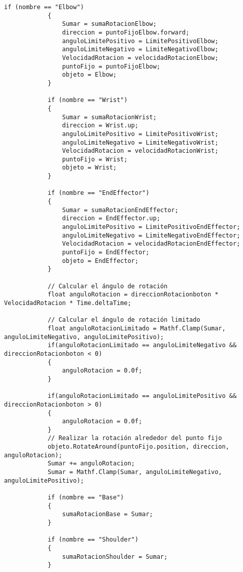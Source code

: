 \begin{lstlisting}[frame=single]
            if (nombre == "Elbow")
            {
                Sumar = sumaRotacionElbow;
                direccion = puntoFijoElbow.forward;
                anguloLimitePositivo = LimitePositivoElbow;
                anguloLimiteNegativo = LimiteNegativoElbow;
                VelocidadRotacion = velocidadRotacionElbow;
                puntoFijo = puntoFijoElbow;
                objeto = Elbow;
            }
    
            if (nombre == "Wrist")
            {
                Sumar = sumaRotacionWrist;
                direccion = Wrist.up;
                anguloLimitePositivo = LimitePositivoWrist;
                anguloLimiteNegativo = LimiteNegativoWrist;
                VelocidadRotacion = velocidadRotacionWrist;
                puntoFijo = Wrist;
                objeto = Wrist;
            }
    
            if (nombre == "EndEffector")
            {
                Sumar = sumaRotacionEndEffector;
                direccion = EndEffector.up;
                anguloLimitePositivo = LimitePositivoEndEffector;
                anguloLimiteNegativo = LimiteNegativoEndEffector;
                VelocidadRotacion = velocidadRotacionEndEffector;
                puntoFijo = EndEffector;
                objeto = EndEffector;
            }
            
            // Calcular el ángulo de rotación
            float anguloRotacion = direccionRotacionboton * VelocidadRotacion * Time.deltaTime;
            
            // Calcular el ángulo de rotación limitado
            float anguloRotacionLimitado = Mathf.Clamp(Sumar, anguloLimiteNegativo, anguloLimitePositivo);
            if(anguloRotacionLimitado == anguloLimiteNegativo && direccionRotacionboton < 0)
            {
                anguloRotacion = 0.0f;
            }
    
            if(anguloRotacionLimitado == anguloLimitePositivo && direccionRotacionboton > 0)
            {
                anguloRotacion = 0.0f;
            }
            // Realizar la rotación alrededor del punto fijo
            objeto.RotateAround(puntoFijo.position, direccion, anguloRotacion);
            Sumar += anguloRotacion;
            Sumar = Mathf.Clamp(Sumar, anguloLimiteNegativo, anguloLimitePositivo);
    
            if (nombre == "Base")
            {
                sumaRotacionBase = Sumar;
            }
    
            if (nombre == "Shoulder")
            {
                sumaRotacionShoulder = Sumar;
            }
    

\end{lstlisting}
